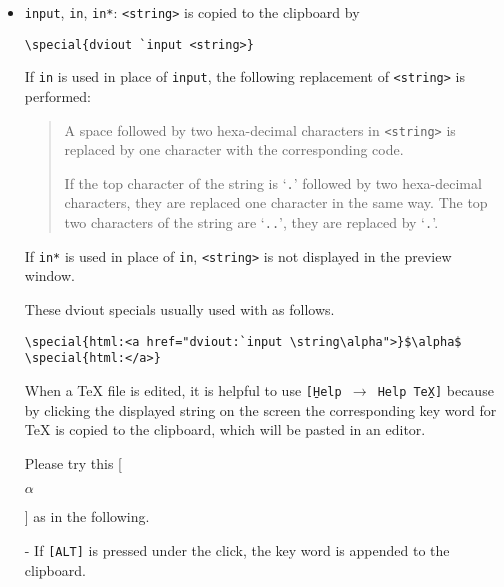 \documentclass{article}
\begin{document}
\begin{itemize}
In this example, the first  \verb|\special{dviout `+M-}| equals to\\
\verb|\special{dviout `+1-}| and the second to \verb|\special{dviout `+2-}|.
This corressponds to the example using  but they do
not exacltly lead the same result.
\begin{verbatim}
  I am a \special{dviout `+0}dog.%
  \llap{\special{dviout `+1-}cat.}\special{dviout `+0-}
  You are ...
\end{verbatim}
implies that the sentence ``I am a dog. You are..." is first displayed and 
it changes into ``I am a cat. You are  ..." by clicking {\tt[Space]}.

Try a \href{file:slisamp4.dvi}{sample} using ths special.

\item {\tt input}, {\tt in}, {\tt in*}: {\tt <string>} is copied to the
clipboard by
\begin{verbatim}
\special{dviout `input <string>}
\end{verbatim}
If {\tt in} is used in place of {\tt input}, the following replacement of 
{\tt <string>} is performed:
\begin{quote}
A space followed by two hexa-decimal characters in {\tt <string>} is 
replaced by one character with the corresponding code.

If the top character of the string is `{\tt .}' followed by two hexa-decimal
characters, they are replaced one character in the same way. 
The top two characters of the string are `{\tt ..}', 
they are replaced by `{\tt .}'.
\end{quote}

If {\tt in*} is used in place of {\tt in}, {\tt <string>} is not displayed
in the preview window.

These dviout specials usually used with 
as follows.
\begin{verbatim}
\special{html:<a href="dviout:`input \string\alpha">}$\alpha$
\special{html:</a>}
\end{verbatim}
When a {\TeX} file is edited, 
it is helpful to use {\tt[\b{H}elp $\to$ Help Te\b{X}]}
because by clicking the displayed string on the screen the corresponding key 
word for {\TeX} is copied to the clipboard, which will be pasted in an editor.

\qquad
Please try this [
$\alpha$
]
as in the following.

- If {\tt [ALT]} is pressed under the click, the key word is appended to the 
clipboard.


\end{itemize}
\end{document}
